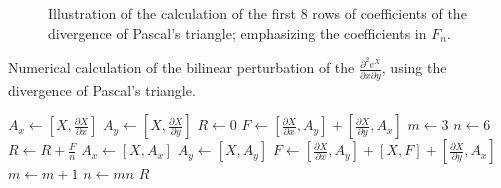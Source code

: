 \begin{figure}[!ht]
	\caption[Pascal's triangle divergence]{Illustration of the calculation of the first 8 rows of coefficients of the divergence of Pascal's triangle; emphasizing the coefficients in $F_n$.}
	\label{fig:pascaldivergence}
\end{figure}
\begin{algorithm}[!ht]
	\caption[Bilinear perturbation of $\frac{\partial^2 e^X}{\partial x \partial y}$]{Numerical calculation of the bilinear perturbation of the $\frac{\partial^2 e^X}{\partial x \partial y}$, using the divergence of Pascal's triangle.}
	\label{alg:bilinear}
	\begin{algorithmic}[1]
			\State $A_x \gets \left[X,\frac{\partial X}{\partial x}\right]$
			\State $A_y \gets \left[X,\frac{\partial X}{\partial y}\right]$
			\State $R \gets 0$
			\State $F \gets \left[\frac{\partial X}{\partial x}, A_y\right] + \left[\frac{\partial X}{\partial y},A_x\right]$
			\State $m \gets 3$
			\State $n \gets 6$
				\State $R \gets R + \frac{F}{n}$
				\State $A_x \gets \left[X,A_x\right]$
				\State $A_y \gets \left[X,A_y\right]$
				\State $F \gets \left[\frac{\partial X}{\partial x}, A_y\right] + \left[X,F\right] + \left[\frac{\partial X}{\partial y},A_x\right]$
				\State $m \gets m+1$
				\State $n \gets m n$
			\EndWhile
			\State \Return $R$
		\EndFunction
	\end{algorithmic}
\end{algorithm}

